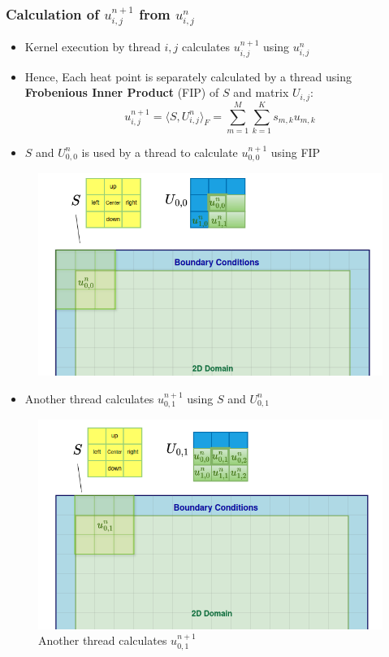 \documentclass[9pt]{beamer}
\begin{document}
\begin{frame}
\frametitle{Calculation of $u_{i,j}^{n+1}$ from $u_{i,j}^{n}$}
\vspace{-0.1\baselineskip}
    \begin{itemize}
        \item Kernel execution by thread ${i,j}$  calculates $u_{i,j}^{n+1}$ using $u_{i,j}^{n}$
        \item Hence, Each heat point is separately calculated by a thread using \textbf{Frobenious Inner Product} (FIP) of \( S \) and matrix \( U_{i,j} \):
\[
 u_{i,j}^{n+1} = \langle S, U^{n}_{i,j} \rangle_F = \sum_{m=1}^{M} \sum_{k=1}^{K} s_{m,k} u_{m,k}
\]
        \item $S$ and $U^{n}_{0,0}$ is used  by a thread to calculate $u_{0,0}^{n+1}$ using FIP
    \end{itemize}
    \begin{figure}
        \centering
            \includegraphics[width=0.75\linewidth, height=0.4\textheight]{Screenshot from 2024-09-22 00-16-53.png}
        \label{fig:enter-label}
    \end{figure}
\end{frame}

\begin{frame}
\vspace{-0.9\baselineskip}
    \begin{itemize}
        \item Another thread calculates $u_{0,1}^{n+1}$  using $S$ and $U^{n}_{0,1}$
    \end{itemize}
    \begin{figure}
        \centering
        \includegraphics[width=0.8\linewidth,height=0.45\linewidth]{Screenshot from 2024-09-21 23-44-50.png}
        \caption{Another thread calculates $u_{0,1}^{n+1}$ }
        \label{fig:enter-label}
    \end{figure}
\end{frame}
\end{document}
